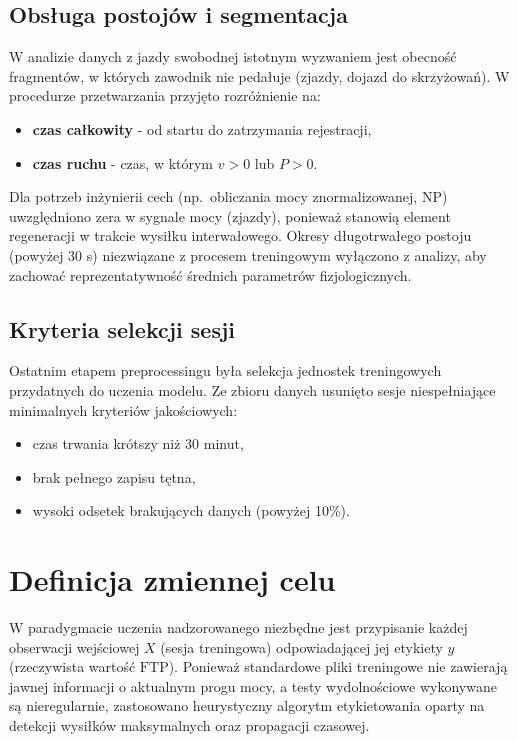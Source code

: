 \subsection{Obsługa postojów i segmentacja}

W analizie danych z jazdy swobodnej istotnym wyzwaniem jest obecność fragmentów, w których zawodnik nie pedałuje (zjazdy, dojazd do skrzyżowań).
W procedurze przetwarzania przyjęto rozróżnienie na:
\begin{itemize}
  \item \textbf{czas całkowity} - od startu do zatrzymania rejestracji,
  \item \textbf{czas ruchu} - czas, w którym $v > 0$ lub $P > 0$.
\end{itemize}

Dla potrzeb inżynierii cech (np.\ obliczania mocy znormalizowanej, $\mathrm{NP}$) uwzględniono zera w sygnale mocy (zjazdy), ponieważ stanowią element regeneracji w trakcie wysiłku interwałowego.
Okresy długotrwałego postoju (powyżej 30 s) niezwiązane z procesem treningowym wyłączono z analizy, aby zachować reprezentatywność średnich parametrów fizjologicznych.

\subsection{Kryteria selekcji sesji}

Ostatnim etapem preprocessingu była selekcja jednostek treningowych przydatnych do uczenia modelu.
Ze zbioru danych usunięto sesje niespełniające minimalnych kryteriów jakościowych:
\begin{itemize}
  \item czas trwania krótszy niż 30 minut,
  \item brak pełnego zapisu tętna,
  \item wysoki odsetek brakujących danych (powyżej 10\%).
\end{itemize}

\section{Definicja zmiennej celu}

W paradygmacie uczenia nadzorowanego niezbędne jest przypisanie każdej obserwacji wejściowej $X$ (sesja treningowa) odpowiadającej jej etykiety $y$ (rzeczywista wartość $\mathrm{FTP}$).
Ponieważ standardowe pliki treningowe nie zawierają jawnej informacji o aktualnym progu mocy, a testy wydolnościowe wykonywane są nieregularnie, zastosowano heurystyczny algorytm etykietowania oparty na detekcji wysiłków maksymalnych oraz propagacji czasowej.

